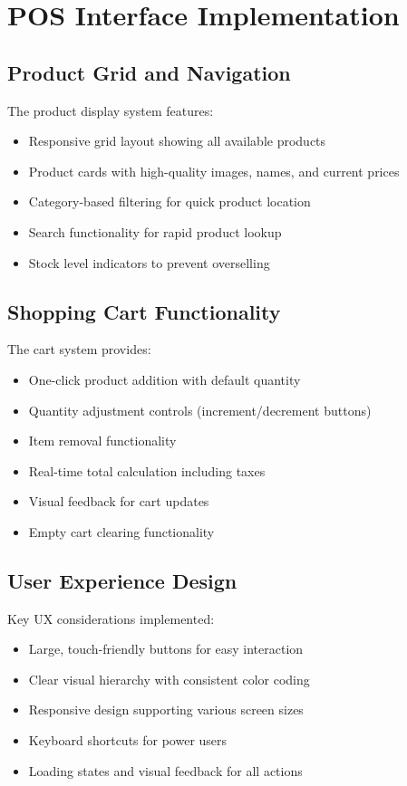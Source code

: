 \section{POS Interface Implementation}

\subsection*{Product Grid and Navigation}

The product display system features:
\begin{itemize}
  \item Responsive grid layout showing all available products
  \item Product cards with high-quality images, names, and current prices
  \item Category-based filtering for quick product location
  \item Search functionality for rapid product lookup
  \item Stock level indicators to prevent overselling
\end{itemize}

\subsection*{Shopping Cart Functionality}

The cart system provides:
\begin{itemize}
  \item One-click product addition with default quantity
  \item Quantity adjustment controls (increment/decrement buttons)
  \item Item removal functionality
  \item Real-time total calculation including taxes
  \item Visual feedback for cart updates
  \item Empty cart clearing functionality
\end{itemize}

\subsection*{User Experience Design}

Key UX considerations implemented:
\begin{itemize}
  \item Large, touch-friendly buttons for easy interaction
  \item Clear visual hierarchy with consistent color coding
  \item Responsive design supporting various screen sizes
  \item Keyboard shortcuts for power users
  \item Loading states and visual feedback for all actions
\end{itemize}

